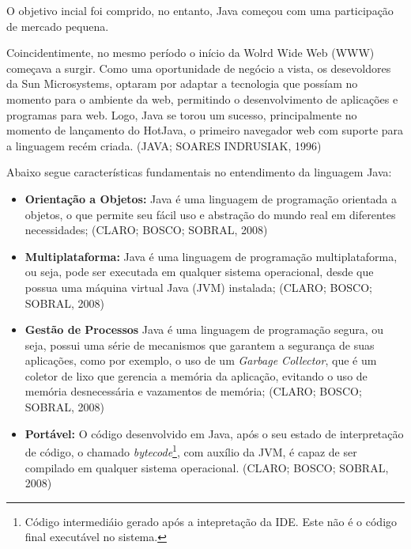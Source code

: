 \documentclass[a4paper,12pt]{article}
\begin{document}
O objetivo incial foi comprido, no entanto, Java começou com uma participação de mercado pequena. 

Coincidentimente, no mesmo período o início da Wolrd Wide Web (WWW) começava a surgir. Como uma oportunidade de negócio a vista, os desevoldores da Sun
Microsystems, optaram por adaptar a tecnologia que possíam no momento para o ambiente da web, permitindo o desenvolvimento de aplicações e programas para web.
Logo, Java se torou um sucesso, principalmente no momento de lançamento do HotJava, o primeiro navegador web com suporte para a linguagem recém criada. (JAVA; SOARES INDRUSIAK, 1996)

Abaixo segue características fundamentais no entendimento da linguagem Java:
\begin{itemize}
	\item \textbf{Orientação a Objetos:} Java é uma linguagem de programação orientada a objetos, o que permite seu fácil uso e abstração do mundo real em diferentes necessidades; (CLARO; BOSCO; SOBRAL, 2008)
	\item \textbf{Multiplataforma:} Java é uma linguagem de programação multiplataforma, ou seja, pode ser executada em qualquer sistema operacional, desde que possua uma máquina virtual Java (JVM) instalada; (CLARO; BOSCO; SOBRAL, 2008)
	\item \textbf{Gestão de Processos} Java é uma linguagem de programação segura, ou seja, possui uma série de mecanismos que garantem a segurança de suas aplicações, como por exemplo, o uso de um \textit{Garbage Collector}, 
	que é um coletor de lixo que gerencia a memória da aplicação, evitando o uso de memória desnecessária e vazamentos de memória; (CLARO; BOSCO; SOBRAL, 2008)
	\item \textbf{Portável:} O código desenvolvido em Java, após o seu estado de interpretação de código, o chamado \textit{bytecode}\footnote{
		Código intermediáio gerado após a intepretação da IDE. Este não é o código final executável no sistema.
	}, com auxílio da JVM, é capaz de ser compilado em qualquer sistema operacional. (CLARO; BOSCO; SOBRAL, 2008)
\end{itemize}
\end{document}
